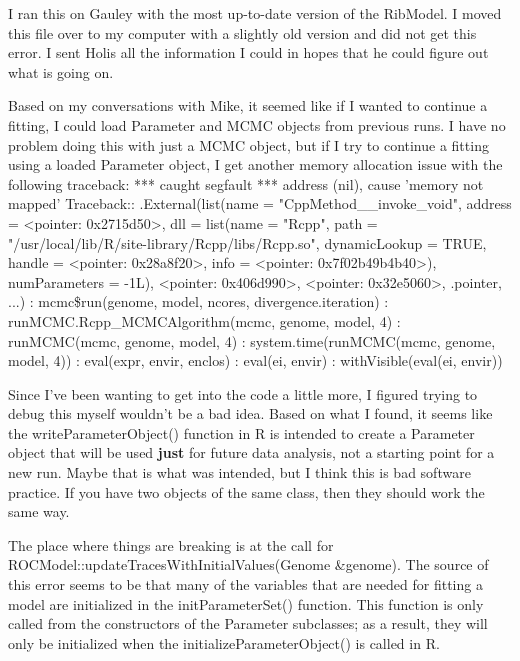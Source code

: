 \documentclass[11pt]{labbook}
\begin{document}
I ran this on Gauley with the most up-to-date version of the RibModel. I moved this file over to my computer with a slightly old version and did not get this error. I sent Holis all the information I could in hopes that he could figure out what is going on.

Based on my conversations with Mike, it seemed like if I wanted to continue a fitting, I could load Parameter and MCMC objects from previous runs. I have no problem doing this with just a MCMC object, but if I try to continue a fitting using a loaded Parameter object, I get another memory allocation issue with the following traceback:
\newline
 *** caught segfault ***
address (nil), cause 'memory not mapped'
\newline
Traceback:: .External(list(name = "CppMethod\_\_invoke\_void", address = <pointer: 0x2715d50>,     dll = list(name = "Rcpp", path = "/usr/local/lib/R/site-library/Rcpp/libs/Rcpp.so",         dynamicLookup = TRUE, handle = <pointer: 0x28a8f20>,         info = <pointer: 0x7f02b49b4b40>), numParameters = -1L),     <pointer: 0x406d990>, <pointer: 0x32e5060>, .pointer, ...)
: mcmc\$run(genome, model, ncores, divergence.iteration)
: runMCMC.Rcpp\_MCMCAlgorithm(mcmc, genome, model, 4)
: runMCMC(mcmc, genome, model, 4)
: system.time(runMCMC(mcmc, genome, model, 4))
: eval(expr, envir, enclos)
: eval(ei, envir)
: withVisible(eval(ei, envir))
\newline

Since I've been wanting to get into the code a little more, I figured trying to debug this myself wouldn't be a bad idea. Based on what I found, it seems like the writeParameterObject() function in R is intended to create a Parameter object that will be used \textbf{just} for future data analysis, not a starting point for a new run. Maybe that is what was intended, but I think this is bad software practice. If you have two objects of the same class, then they should work the same way.

The place where things are breaking is at the call for ROCModel::updateTracesWithInitialValues(Genome \&genome). The source of this error seems to be that many of the variables that are needed for fitting a model are initialized in the initParameterSet() function. This function is only called from the constructors of the Parameter subclasses; as a result, they will only be initialized when the initializeParameterObject() is called in R. 
\end{document}
